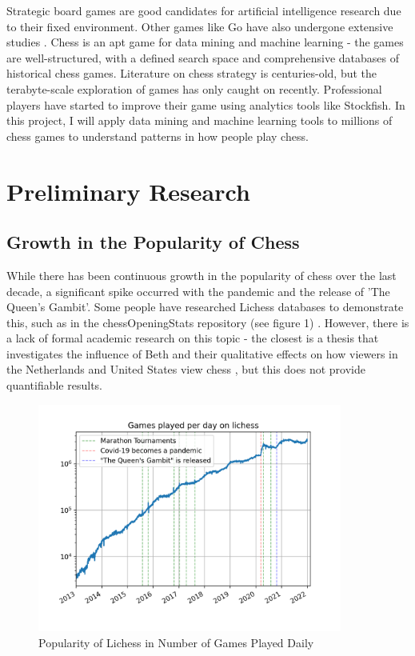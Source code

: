 \documentclass[%
 superscriptaddress,
showpacs,preprintnumbers,
 amsmath,
 amssymb,
 aps,
 pra,
showkeys,
onecolumn,
notitlepage,
11pt,
tightenlines      %
]{revtex4-1}
\begin{document}
Strategic board games are good candidates for artificial intelligence research due to their fixed environment. Other games like Go have also undergone extensive studies \cite{muller2002computer}. Chess is an apt game for data mining and machine learning - the games are well-structured, with a defined search space and comprehensive databases of historical chess games. Literature on chess strategy is centuries-old, but the terabyte-scale exploration of games has only caught on recently. Professional players have started to improve their game using analytics tools like Stockfish. In this project, I will apply data mining and machine learning tools to millions of chess games to understand patterns in how people play chess.

\section{Preliminary Research}
\subsection{Growth in the Popularity of Chess}
While there has been continuous growth in the popularity of chess over the last decade, a significant spike occurred with the pandemic and the release of 'The Queen's Gambit'. Some people have researched Lichess databases to demonstrate this, such as in the chessOpeningStats repository (see figure 1) \cite{chessOpeningStats}. However, there is a lack of formal academic research on this topic - the closest is a thesis that investigates the influence of Beth and their qualitative effects on how viewers in the Netherlands and United States view chess \cite{lowie2021big}, but this does not provide quantifiable results.

\begin{figure}
\caption{Popularity of Lichess in Number of Games Played Daily \cite{chessOpeningStats}}
\begin{center}
\includegraphics[width=10cm]{images/Lichess Number of Games Played Per Day.png}
\end{center}
\end{figure}
\end{document}
